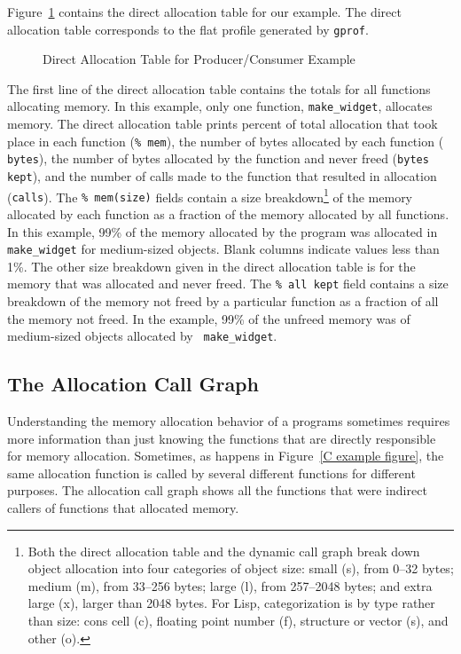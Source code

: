 Figure~\ref{direct allocation figure} contains the direct allocation
table for our example.  The direct allocation table corresponds to the
flat profile generated by {\tt gprof}.

\begin{figure}[htbp]
\begin{singlespace}
{\scriptsize

}
\end{singlespace}

\caption{Direct Allocation Table for Producer/Consumer Example}
\label{direct allocation figure}
\end{figure}

The first line of the direct allocation table contains the totals for
all functions allocating memory.  In this example, only one function,
{\tt make\_widget}, allocates memory.  The direct allocation table
prints percent of total allocation that took place in each function
({\tt \%~mem}), the number of bytes allocated by each function ({\tt
bytes}), the number of bytes allocated by the function and never freed
({\tt bytes kept}), and the number of calls made to the function that
resulted in allocation ({\tt calls}).  The {\tt \%~mem(size)} fields
contain a size breakdown\footnote{ Both the direct allocation table
and the dynamic call graph break down object allocation into four
categories of object size: small (s), from 0--32 bytes; medium (m),
from 33--256 bytes; large (l), from 257--2048 bytes; and extra large
(x), larger than 2048 bytes.  For Lisp, categorization is by type
rather than size: cons cell (c), floating point number (f), structure
or vector (s), and other (o).} of the memory allocated by each
function as a fraction of the memory allocated by all functions.  In
this example, 99\% of the memory allocated by the program was
allocated in {\tt make\_widget} for medium-sized objects.  Blank
columns indicate values less than 1\%.  The other size breakdown given
in the direct allocation table is for the memory that was allocated
and never freed.  The {\tt \%~all~kept} field contains a size
breakdown of the memory not freed by a particular function as a
fraction of all the memory not freed.  In the example, 99\% of the
unfreed memory was of medium-sized objects allocated by {\tt
make\_widget}.

\subsection{The Allocation Call Graph}

Understanding the memory allocation behavior of a programs sometimes
requires more information than just knowing the functions that are
directly responsible for memory allocation.  Sometimes, as happens in
Figure~\ref{C example figure}, the same allocation function is called
by several different functions for different purposes.  The allocation
call graph shows all the functions that were indirect callers of
functions that allocated memory.

